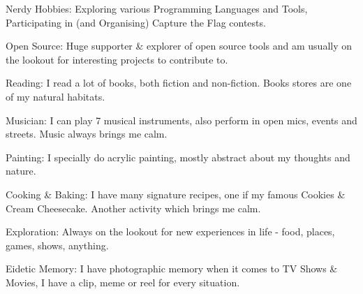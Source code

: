 


\begin{cventries}
  \cventry
    {}
    {}
    {}
    {}
    {
      \vspace{-4.0mm}
      \begin{cvitems}
          \item Nerdy Hobbies: Exploring various Programming Languages and Tools, Participating in (and Organising) Capture the Flag contests.
          \item Open Source: Huge supporter \& explorer of open source tools and am usually on the lookout for interesting projects to contribute to.
          \item Reading: I read a lot of books, both fiction and non-fiction. Books stores are one of my natural habitats.
          \item Musician: I can play 7 musical instruments, also perform in open mics, events and streets. Music always brings me calm.
          \item Painting: I specially do acrylic painting, mostly abstract about my thoughts and nature.
          \item Cooking \& Baking: I have many signature recipes, one if my famous Cookies \& Cream Cheesecake. Another activity which brings me calm.
          \item Exploration: Always on the lookout for new experiences in life - food, places, games, shows, anything.
          \item Eidetic Memory: I have photographic memory when it comes to TV Shows \& Movies, I have a clip, meme or reel for every situation.
      \end{cvitems}
    }
\end{cventries}
